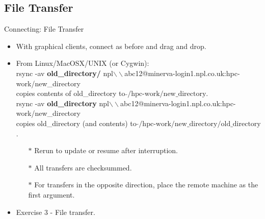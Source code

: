 \subsection{File Transfer}
\begin{frame}{Connecting: File Transfer}
\begin{itemize}
\item With graphical clients, connect as before and drag and drop.
\pause
\item From Linux/MacOSX/UNIX (or Cygwin):\hfill\\
\alert{\footnotesize rsync -av \textbf{old\_directory/} npl$\backslash\backslash$abc12@minerva-login1.npl.co.uk:hpc-work/new\_directory}\hfill\\
copies contents of old\_directory to $\tilde{}\text{/hpc-work/new\_directory}$.\hfill\\\smallskip
\pause
\alert{\footnotesize rsync -av \textbf{old\_directory} npl$\backslash\backslash$abc12@minerva-login1.npl.co.uk:hpc-work/new\_directory}\hfill\\
copies old\_directory (and contents) to $\tilde{}\text{/hpc-work/new\_directory/old\_directory}$.\hfill\\
\pause
\begin{itemize}
\item[$\ast$]Rerun to update or resume after interruption.
\item[$\ast$]All transfers are checksummed.
\item[$\ast$]For transfers in the opposite direction, place the remote machine as the first argument.
\end{itemize}
\pause
\item{Exercise 3 - File transfer.}
\end{itemize}
\end{frame}

